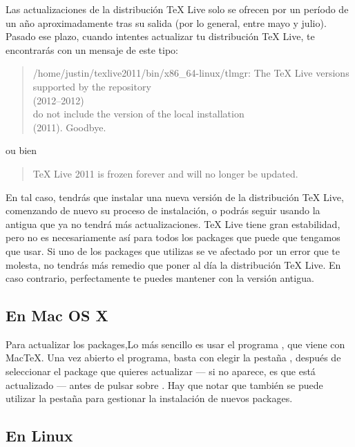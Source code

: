 \begin{attention}
    Las actualizaciones de la distribución TeX Live solo se ofrecen por un período de un año aproximadamente tras su salida (por lo general, entre mayo y julio). Pasado ese plazo, cuando intentes actualizar tu distribución TeX Live, te encontrarás con un mensaje de este tipo:

    \begin{quotation}
/home/justin/texlive2011/bin/x86\_64-linux/tlmgr: The TeX Live versions supported by the repository\\
  (2012--2012)\\
do not include the version of the local installation\\
  (2011).  Goodbye.
    \end{quotation}
    
    ou bien
    
    \begin{quotation}
    TeX Live 2011 is frozen forever and will no
longer be updated.
	\end{quotation}

En tal caso, tendrás que instalar una nueva versión de la distribución TeX Live, comenzando de nuevo su proceso de instalación, o podrás seguir usando la antigua que ya no tendrá más actualizaciones. TeX Live tiene gran estabilidad, pero no es necesariamente así para todos los packages que puede que tengamos que usar. Si uno de los packages que utilizas se ve afectado por un error que te molesta, no tendrás más remedio que poner al día la distribución TeX Live. En caso contrario, perfectamente te puedes mantener con la versión antigua.
\end{attention}

\subsection{En Mac OS X}\label{majosX}

Para actualizar los packages,Lo más sencillo es usar el programa , que viene con MacTeX. Una vez abierto el programa, basta con elegir la pestaña , después de seleccionar el package que quieres actualizar --- si no aparece, es que está actualizado --- antes de pulsar sobre . Hay que notar que también se puede utilizar la pestaña  para gestionar la instalación de nuevos packages.

\subsection{En Linux}

